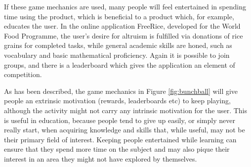 If these game mechanics are used, many people will feel entertained in spending time using the product, which is beneficial to a product which, for example, educates the user. In the online application FreeRice, developed for the World Food Programme, the user's desire for altruism is fulfilled via donations of rice grains for completed tasks, while general academic skills are honed, such as vocabulary and basic mathematical proficiency. Again it is possible to join groups, and there is a leaderboard which gives the application an element of competition. \cite{freerice}

As has been described, the game mechanics in Figure \ref{fig:bunchball} will give people an extrinsic motivation (rewards, leaderboards etc) to keep playing, although the activity might not carry any intrinsic motivation for the user. This is useful in education, because people tend to give up easily, or simply never really start, when acquiring knowledge and skills that, while useful, may not be their primary field of interest. Keeping people entertained while learning can ensure that they spend more time on the subject and may also pique their interest in an area they might not have explored by themselves.